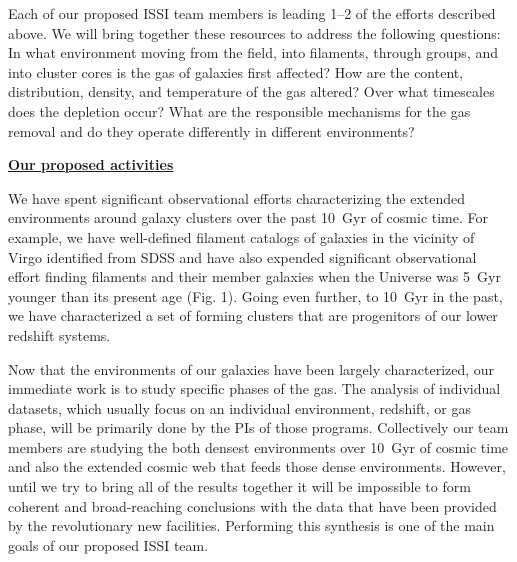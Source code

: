 \documentclass[11pt]{article}
\begin{document}
Each of our proposed ISSI team members is leading 1--2 of the efforts
described above.  We will bring together these resources to
address the following questions: In what environment moving from the
field, into filaments, through groups, and into cluster cores is the gas of galaxies
first affected?  How are the content, distribution, density,
and temperature of the gas altered?  Over what timescales does the
depletion occur?  What are the responsible mechanisms for the gas
removal and do they operate differently in different environments?

\centerline{{\bf \underline{ Our proposed activities}}}
\medskip

We have spent significant observational efforts characterizing the extended environments around galaxy clusters over the past 10~Gyr of cosmic time.  For example, we have well-defined filament catalogs of galaxies in the vicinity of Virgo identified from SDSS and have also expended significant observational effort finding filaments and their member galaxies when the Universe was 5~Gyr younger than its present age (Fig. 1).  Going even further, to 10~Gyr in the past, we have characterized a set of forming clusters that are progenitors of our lower redshift systems.

Now that the environments of our galaxies have been largely characterized, our immediate work is to study specific phases of the gas.  The analysis of individual datasets, which usually focus on an individual
environment, redshift, or gas phase, will be primarily done by the PIs
of those programs.  Collectively our team members are studying the both
densest environments over 10~Gyr of cosmic time and also the extended cosmic web that feeds those dense environments.  However, until we
try to bring all of the results together it will be impossible to form
coherent and broad-reaching conclusions with the data that have been
provided by the revolutionary new facilities.  Performing this
synthesis is one of the main goals of our proposed ISSI team.
\end{document}

